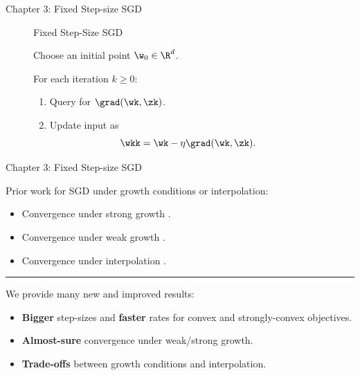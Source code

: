 \documentclass[mathserif,notheorems, hyperref={colorlinks, citecolor=blue, urlcolor=blue, linkcolor=blue}]{beamer}
\begin{document}
    \begin{frame}{Chapter 3: Fixed Step-size SGD}
       
        \begin{figure}[t]
        \begin{procedure}{Fixed Step-Size SGD}
        \item Choose an initial point \( \w_0 \in \R^d \).
            \vspace{2ex}
        \item For each iteration \( k \geq 0 \):
            \begin{enumerate}
                \item Query \oracle{} for \( \grad(\wk, \zk) \).
                    \vspace{1ex}
                \item Update input as\vspace{-1ex}%
                    \[ \wkk = \wk - \eta \grad(\wk, \zk). \]
            \end{enumerate}
        \end{procedure}
        \end{figure}


    \end{frame}

    \begin{frame}{Chapter 3: Fixed Step-size SGD}
        
        Prior work for SGD under growth conditions or interpolation: 
        \begin{itemize}
            \item Convergence under strong growth \citep{tseng1998incremental, solodov1998incremental, schmidt2013fast, cevher2018linear}.
            \item Convergence under weak growth \citep{vaswani2019fast}.
            \item Convergence under interpolation \citep{bassily2018exponential}. 
        \end{itemize}
        \vspace{2ex}

       \pause
       \rule{\textwidth}{0.5px}
       \vspace{1ex}

       We provide many new and improved results: 
       \begin{itemize}
           \item \textbf{Bigger} step-sizes and \textbf{faster} rates for convex and strongly-convex objectives. 
           \item \textbf{Almost-sure} convergence under weak/strong growth. 
           \item \textbf{Trade-offs} between growth conditions and interpolation. 
       \end{itemize}
    \end{frame}
\end{document}
